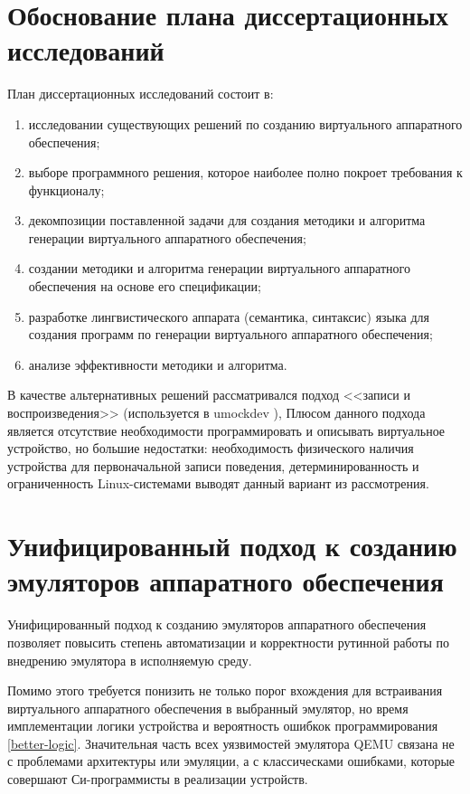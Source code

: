 \section{Обоснование плана диссертационных исследований}\label{sec:ch1/sec3}

План диссертационных исследований состоит в:

\begin{enumerate}[label={\arabic*)}]
    \item исследовании существующих решений по созданию виртуального аппаратного обеспечения;
    \item выборе программного решения, которое наиболее полно покроет требования к функционалу;
    \item декомпозиции поставленной задачи для создания методики и алгоритма генерации виртуального аппаратного обеспечения;
    \item создании методики и алгоритма генерации виртуального аппаратного обеспечения на основе его спецификации;
    \item разработке лингвистического аппарата (семантика, синтаксис) языка для создания программ по генерации виртуального
        аппаратного обеспечения;
    \item анализе эффективности методики и алгоритма.
\end{enumerate}

В качестве альтернативных решений рассматривался подход <<записи и воспроизведения>> (используется в umockdev \cite{umockdev}),
Плюсом данного подхода является отсутствие необходимости программировать и описывать виртуальное устройство,
но большие недостатки: необходимость физического наличия устройства для первоначальной записи
поведения, детерминированность и ограниченность Linux-системами выводят данный вариант из рассмотрения.


\section{Унифицированный подход к созданию эмуляторов аппаратного обеспечения}\label{sec:ch1/sec4}

Унифицированный подход к созданию эмуляторов аппаратного обеспечения позволяет
повысить степень автоматизации и корректности рутинной работы по внедрению
эмулятора в исполняемую среду.

Помимо этого требуется понизить не только порог вхождения для встраивания виртуального аппаратного обеспечения
в выбранный эмулятор, но время имплементации логики устройства и вероятность ошибкок программирования \ref{better-logic}.
Значительная часть всех уязвимостей эмулятора QEMU связана не с проблемами архитектуры или эмуляции,
а с классическами ошибками, которые совершают Си-программисты в реализации устройств.


